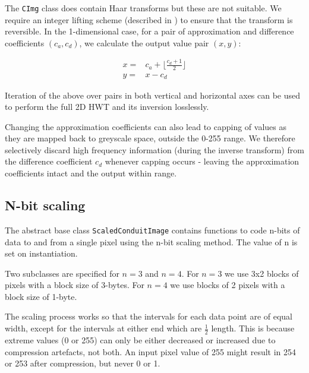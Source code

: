 The {\tt CImg} class does contain Haar transforms but these are not suitable. We require an integer lifting scheme (described in \cite{haar}) to ensure that the transform is reversible. In the 1-dimensional case, for a pair of approximation and difference coefficients $(c_a,c_d)$, we calculate the output value pair $(x,y)$: 

\begin{eqnarray}
    x = & c_a + \lfloor \frac{c_d+1}{2} \rfloor \nonumber \\ 
    y = & x - c_d
\end{eqnarray}

Iteration of the above over pairs in both vertical and horizontal axes can be used to perform the full 2D HWT and its inversion losslessly.

Changing the approximation coefficients can also lead to capping of values as they are mapped back to greyscale space, outside the 0-255 range. We therefore selectively discard high frequency information (during the inverse transform) from the difference coefficient $c_d$ whenever capping occurs - leaving the approximation coefficients intact and the output within range.



\FloatBarrier
\subsection{N-bit scaling}

The abstract base class {\tt ScaledConduitImage} contains functions to code n-bits of data to and from a single pixel using the n-bit scaling method. The value of n is set on instantiation.

Two subclasses are specified for $n=3$ and $n=4$. For $n=3$ we use 3x2 blocks of pixels with a block size of 3-bytes. For $n=4$ we use blocks of 2 pixels with a block size of 1-byte.

The scaling process works so that the intervals for each data point are of equal width, except for the intervals at either end which are $\frac{1}{2}$ length. This is because extreme values (0 or 255) can only be either decreased or increased due to compression artefacts, not both. An input pixel value of 255 might result in 254 or 253 after compression, but never 0 or 1.

